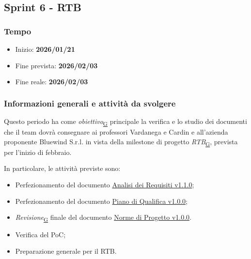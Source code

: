 \documentclass[a4paper,12pt]{article}
\begin{document}
        
    \subsection{Sprint 6 - RTB}{
        \subsubsection{Tempo}{
            \begin{itemize}
                \item[] Inizio: \textbf{2026/01/21} 
                \item[] Fine prevista: \textbf{2026/02/03} 
                \item[] Fine reale: \textbf{2026/02/03} 
            \end{itemize}
        }
    \subsubsection{Informazioni generali e attività da svolgere}{
        Questo periodo ha come \textit{obiettivo}\textsubscript{\href{https://atlasteam9.github.io/Atlas/glossario.html\#Obiettivo}{G}} principale la verifica e lo studio dei documenti che il team dovrà consegnare ai professori Vardanega e Cardin e all'azienda proponente Bluewind S.r.l. in vista della milestone di progetto \textit{RTB}\textsubscript{\href{https://atlasteam9.github.io/Atlas/glossario.html\#RTB}{G}}, prevista per l'inizio di febbraio.
    }
            
    \noindent In particolare, le attività previste sono:
            \begin{itemize}
                \item Perfezionamento del documento \href{https://atlasteam9.github.io/Atlas/docs/RTB/documenti/esterni/Analisi%20dei%20Requisiti.pdf}{Analisi dei Requisiti v1.1.0};
                \item Perfezionamento del documento \href{https://atlasteam9.github.io/Atlas/docs/RTB/documenti/esterni/Piano%20di%20Qualifica.pdf}{Piano di Qualifica v1.0.0};
                \item \textit{Revisione}\textsubscript{\href{https://atlasteam9.github.io/Atlas/glossario.html\#Revisione}{G}} finale del documento \href{https://atlasteam9.github.io/Atlas/docs/RTB/documenti/interni/Norme%20di%20Progetto.pdf}{Norme di Progetto v1.0.0}.
                \item Verifica del PoC;
                \item Preparazione generale per il RTB.
            \end{itemize}
        }
\end{document}
